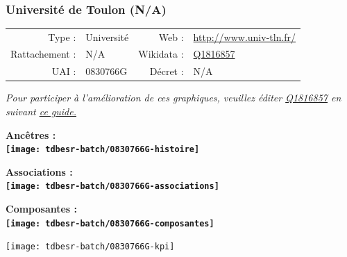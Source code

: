 \documentclass[12pt,french,]{article}
\begin{document}
\ifoddpage \fi ~\newpage  

\hypertarget{universituxe9-de-toulon-na}{%
\subsubsection{Université de Toulon
(N/A)}\label{universituxe9-de-toulon-na}}

\begin{tabular*}{\textwidth}{rp{5cm}rl}  
\hline  
Type : & Université & Web : &\href{http://www.univ-tln.fr/}{http://www.univ-tln.fr/} \\  
Rattachement : & N/A & Wikidata : & \href{https://www.wikidata.org/entity/Q1816857}{Q1816857} \\  
UAI : & 0830766G & Décret : & N/A \\  
\hline  
\end{tabular*}

\textit{\scriptsize Pour participer à l'amélioration de ces graphiques, veuillez éditer  \href{https://www.wikidata.org/entity/Q1816857}{Q1816857}  en suivant \href{https://github.com/cpesr/wikidataESR/blob/master/Rmd/wikidataESR.md}{ce guide.}}

\vspace{1cm}  
\begin{minipage}[b]{0.50\textwidth}\begin{center} \bf Ancêtres : \\  
\texttt{[image: tdbesr-batch/0830766G-histoire]} \end{center}\end{minipage}\begin{minipage}[b]{0.50\textwidth}\begin{center} \bf Associations : \\  
\texttt{[image: tdbesr-batch/0830766G-associations]} \end{center}\end{minipage}

\hrulefill

\begin{center} \bf Composantes : \\  
\texttt{[image: tdbesr-batch/0830766G-composantes]} \end{center}

\begin{center}\texttt{[image: tdbesr-batch/0830766G-kpi]} \end{center}\checkoddpage

\ifoddpage \fi ~\newpage  
\end{document}
